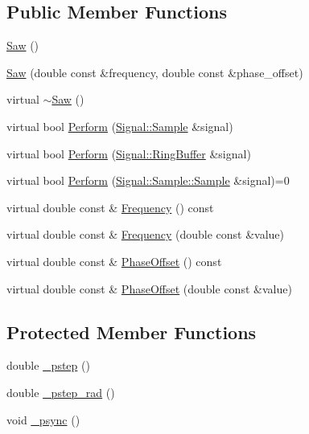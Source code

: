 \subsection*{Public Member Functions}
\begin{DoxyCompactItemize}
\item 
\hyperlink{classDSG_1_1Analog_1_1Saw_a72e678160224241d1e49f7ac78256031}{Saw} ()
\item 
\hyperlink{classDSG_1_1Analog_1_1Saw_ac9689f9ccb3f01e35e5e17b303de51ae}{Saw} (double const \&frequency, double const \&phase\-\_\-offset)
\item 
virtual \hyperlink{classDSG_1_1Analog_1_1Saw_a44fc7af40cb7b8e4135059d8a1a941c4}{$\sim$\-Saw} ()
\item 
virtual bool \hyperlink{classDSG_1_1Analog_1_1Saw_a1a1250328bb1d50999db435a715b0dd4}{Perform} (\hyperlink{classDSG_1_1Signal_1_1Sample}{Signal\-::\-Sample} \&signal)
\item 
virtual bool \hyperlink{classDSG_1_1Analog_1_1Saw_a4a3387786c0187fa4b3344c6ccac2c18}{Perform} (\hyperlink{classDSG_1_1Signal_1_1RingBuffer}{Signal\-::\-Ring\-Buffer} \&signal)
\item 
virtual bool \hyperlink{classDSG_1_1SignalProcess_ae8a803d175eca1ec5f34a52035a082b4}{Perform} (\hyperlink{classDSG_1_1Signal_1_1Sample_a21db6fade3ee3554ed3887cb2b74daff}{Signal\-::\-Sample\-::\-Sample} \&signal)=0
\item 
virtual double const \& \hyperlink{classDSG_1_1SignalGenerator_aedac746c5a70818d120858542ecb7c45}{Frequency} () const 
\item 
virtual double const \& \hyperlink{classDSG_1_1SignalGenerator_ae3ce8d45bafabbd86a0f535b15c3cd46}{Frequency} (double const \&value)
\item 
virtual double const \& \hyperlink{classDSG_1_1SignalGenerator_a1ce521847edd0b837fd840998f906b4b}{Phase\-Offset} () const 
\item 
virtual double const \& \hyperlink{classDSG_1_1SignalGenerator_a08b71b1f30ba65e629642c570291dc0e}{Phase\-Offset} (double const \&value)
\end{DoxyCompactItemize}
\subsection*{Protected Member Functions}
\begin{DoxyCompactItemize}
\item 
double \hyperlink{classDSG_1_1SignalGenerator_ac0d781b8673b3a283bf7c133290ede50}{\-\_\-pstep} ()
\item 
double \hyperlink{classDSG_1_1SignalGenerator_ae660eb4caa88b8d278f8d24d0908a487}{\-\_\-pstep\-\_\-rad} ()
\item 
void \hyperlink{classDSG_1_1SignalGenerator_a05baccb38d1e52860d4fcf7cb8430efc}{\-\_\-psync} ()
\end{DoxyCompactItemize}
